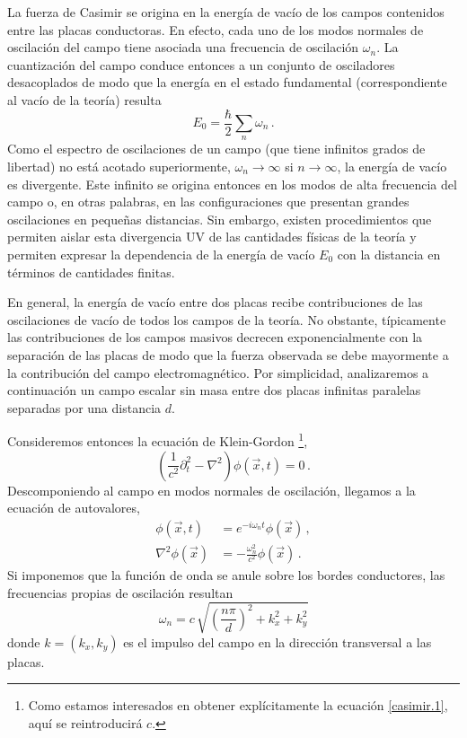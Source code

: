 La fuerza de Casimir se origina en la energía de vacío de los campos contenidos entre las placas conductoras. En efecto, cada uno de los modos normales de oscilación del campo tiene asociada una frecuencia de oscilación $\omega_n$. La cuantización del campo conduce entonces a un conjunto de osciladores desacoplados de modo que la energía en el estado fundamental (correspondiente al vacío de la teoría) resulta
\begin{equation}
E _0 = \frac{\hbar}{2} \sum _n \omega _n\,.
\label{eq.casimir.div}
\end{equation}
Como el espectro de oscilaciones de un campo (que tiene infinitos grados de libertad) no está acotado superiormente, $\omega_n\to\infty$ si $n\to\infty$, la energía de vacío es divergente. Este infinito se origina entonces en los modos de alta frecuencia del campo o, en otras palabras, en las configuraciones que presentan grandes oscilaciones en pequeñas distancias. Sin embargo, existen procedimientos que permiten aislar esta divergencia UV de las cantidades físicas de la teoría y permiten expresar la dependencia de la energía de vacío $E_0$ con la distancia en términos de cantidades finitas.

En general, la energía de vacío entre dos placas recibe contribuciones de las oscilaciones de vacío de todos los campos de la teoría. No obstante, típicamente las contribuciones de los campos masivos decrecen exponencialmente con la separación de las placas de modo que la fuerza observada se debe mayormente a la contribución del campo electromagnético. Por simplicidad, analizaremos a continuación un campo escalar sin masa entre dos placas infinitas paralelas separadas por una distancia $d$.



Consideremos entonces la ecuación de Klein-Gordon \footnote{Como estamos interesados en obtener explícitamente la ecuación \ref{casimir.1}, aquí se reintroducirá $c$.},
\begin{equation}
\left( \frac{1}{c^2} \partial _t ^2 - \nabla  ^2  \right) \phi (\vec{x} ,t) = 0 \,.
\end{equation}
Descomponiendo al campo en modos normales de oscilación, llegamos a la ecuación de autovalores,
\begin{align}
\phi ( \vec{x},t) &= e ^{-i \omega _n t} \phi ( \vec{x}) \,,\\
\nabla ^2 \phi ( \vec{x}) &= - \frac{\omega _n ^2}{c ^2} \phi ( \vec{x})\,.
\end{align}
Si imponemos que la función de onda se anule sobre los bordes conductores, las frecuencias propias de oscilación resultan
\begin{equation}
\omega _n = c\, \sqrt{ \left( \frac{n \pi}{d} \right) ^2 + k _x ^2 + k _y ^2   }
\end{equation}
donde $k=(k_x,k_y)$ es el impulso del campo en la dirección transversal a las placas.


